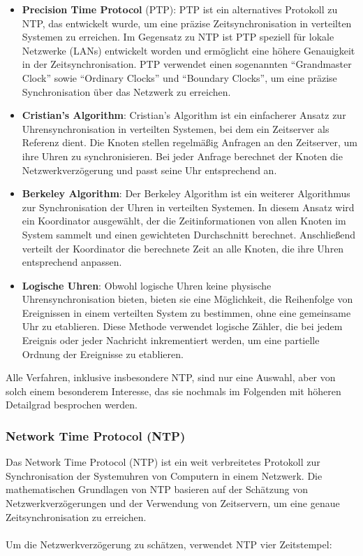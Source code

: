 \begin{itemize}
\item \textbf{Precision Time Protocol} (PTP): PTP ist ein alternatives Protokoll zu NTP, das entwickelt wurde, um eine präzise Zeitsynchronisation in verteilten Systemen zu erreichen. Im Gegensatz zu NTP ist PTP speziell für lokale Netzwerke (LANs) entwickelt worden und ermöglicht eine höhere Genauigkeit in der Zeitsynchronisation. PTP verwendet einen sogenannten \enquote{Grandmaster Clock} sowie \enquote{Ordinary Clocks} und \enquote{Boundary Clocks}, um eine präzise Synchronisation über das Netzwerk zu erreichen.
\item \textbf{Cristian's Algorithm}: Cristian's Algorithm ist ein einfacherer Ansatz zur Uhrensynchronisation in verteilten Systemen, bei dem ein Zeitserver als Referenz dient. Die Knoten stellen regelmäßig Anfragen an den Zeitserver, um ihre Uhren zu synchronisieren. Bei jeder Anfrage berechnet der Knoten die Netzwerkverzögerung und passt seine Uhr entsprechend an.
\item \textbf{Berkeley Algorithm}: Der Berkeley Algorithm ist ein weiterer Algorithmus zur Synchronisation der Uhren in verteilten Systemen. In diesem Ansatz wird ein Koordinator ausgewählt, der die Zeitinformationen von allen Knoten im System sammelt und einen gewichteten Durchschnitt berechnet. Anschließend verteilt der Koordinator die berechnete Zeit an alle Knoten, die ihre Uhren entsprechend anpassen.
\item \textbf{Logische Uhren}: Obwohl logische Uhren keine physische Uhrensynchronisation bieten, bieten sie eine Möglichkeit, die Reihenfolge von Ereignissen in einem verteilten System zu bestimmen, ohne eine gemeinsame Uhr zu etablieren. Diese Methode verwendet logische Zähler, die bei jedem Ereignis oder jeder Nachricht inkrementiert werden, um eine partielle Ordnung der Ereignisse zu etablieren.
\end{itemize}
Alle Verfahren, inklusive insbesondere NTP, sind nur eine Auswahl, aber von solch einem besonderem Interesse, das sie nochmals im Folgenden mit höheren Detailgrad besprochen werden.


\subsubsection{Network Time Protocol (NTP)}
Das Network Time Protocol (NTP) ist ein weit verbreitetes Protokoll zur Synchronisation der Systemuhren von Computern in einem Netzwerk. Die mathematischen Grundlagen von NTP basieren auf der Schätzung von Netzwerkverzögerungen und der Verwendung von Zeitservern, um eine genaue Zeitsynchronisation zu erreichen.
\\\\
Um die Netzwerkverzögerung zu schätzen, verwendet NTP vier Zeitstempel:

